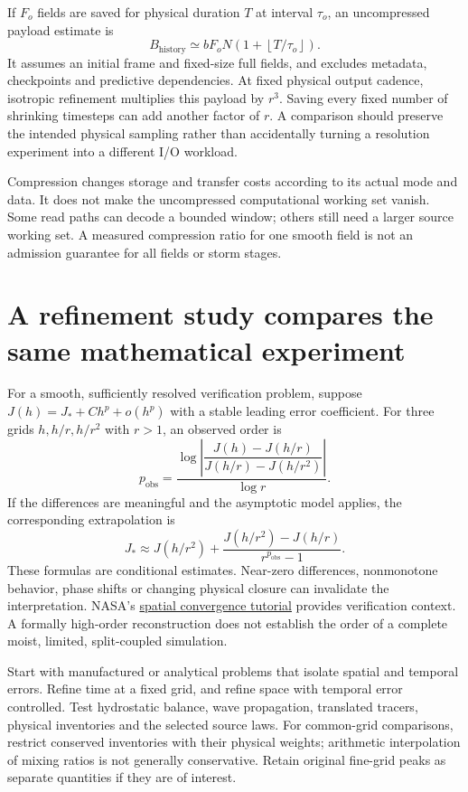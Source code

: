If $F_o$ fields are saved for physical duration $T$ at interval $\tau_o$,
an uncompressed payload estimate is
\[
 B_{\mathrm{history}}\simeq
 bF_oN\left(1+\left\lfloor T/\tau_o\right\rfloor\right).
\]
It assumes an initial frame and fixed-size full fields, and excludes metadata,
checkpoints and predictive dependencies. At fixed physical output cadence,
isotropic refinement multiplies this payload by $r^3$. Saving every fixed
number of shrinking timesteps can add another factor of $r$. A comparison
should preserve the intended physical sampling rather than accidentally
turning a resolution experiment into a different I/O workload.

Compression changes storage and transfer costs according to its actual mode
and data. It does not make the uncompressed computational working set vanish.
Some read paths can decode a bounded window; others still need a larger source
working set. A measured compression ratio for one smooth field is not an
admission guarantee for all fields or storm stages.

\section{A refinement study compares the same mathematical experiment}

For a smooth, sufficiently resolved verification problem, suppose
$J(h)=J_*+Ch^p+o(h^p)$ with a stable leading error coefficient. For three
grids $h,h/r,h/r^2$ with $r>1$, an observed order is
\[
 p_{\mathrm{obs}}=
 \frac{\log\left|\dfrac{J(h)-J(h/r)}{J(h/r)-J(h/r^2)}\right|}{\log r}.
\]
If the differences are meaningful and the asymptotic model applies, the
corresponding extrapolation is
\[
 J_*\approx J(h/r^2)+
 \frac{J(h/r^2)-J(h/r)}{r^{p_{\mathrm{obs}}}-1}.
\]
These formulas are conditional estimates. Near-zero differences, nonmonotone
behavior, phase shifts or changing physical closure can invalidate the
interpretation. NASA's
\href{https://www.grc.nasa.gov/www/wind/valid/tutorial/spatconv.html}{spatial
convergence tutorial} provides verification context. A formally high-order
reconstruction does not establish the order of a complete moist, limited,
split-coupled simulation.

Start with manufactured or analytical problems that isolate spatial and
temporal errors. Refine time at a fixed grid, and refine space with temporal
error controlled. Test hydrostatic balance, wave propagation, translated
tracers, physical inventories and the selected source laws. For common-grid
comparisons, restrict conserved inventories with their physical weights;
arithmetic interpolation of mixing ratios is not generally conservative.
Retain original fine-grid peaks as separate quantities if they are of interest.

